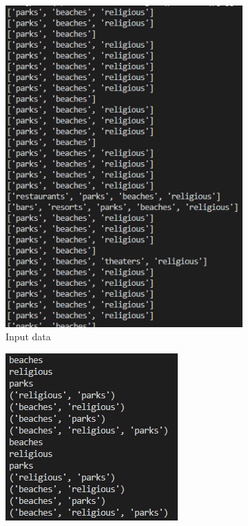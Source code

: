 \documentclass[a4paper]{article}
\begin{document}
	\begin{figure}[h]
		\centering
		
		\begin{subfigure}[b]{0.24\textwidth}
			\centering
			\includegraphics[width=\textwidth]{Baskets.PNG}
         	\caption{Input data}
         	\label{fig:input_data}
		\end{subfigure}
		\hfill
		\begin{subfigure}[b]{0.24\textwidth}
			\centering
			\includegraphics[width=\textwidth]{Batch_fi.PNG}

\end{subfigure}
\end{figure}
\end{document}

